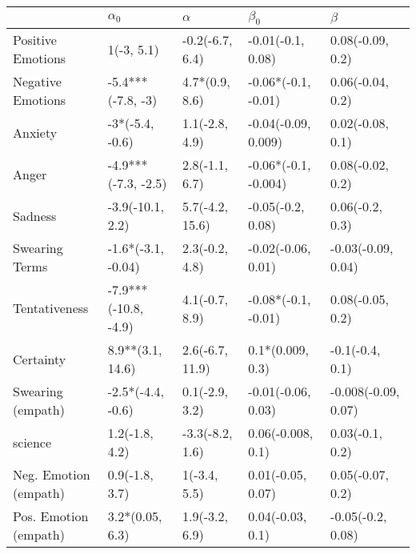 \begin{tabular}{lllll}
\toprule
{} &            $\alpha_0$ &         $\alpha$ &             $\beta_0$ &              $\beta$ \\
\midrule
Positive Emotions     &            1(-3, 5.1) &  -0.2(-6.7, 6.4) &     -0.01(-0.1, 0.08) &     0.08(-0.09, 0.2) \\
Negative Emotions     &     -5.4***(-7.8, -3) &   4.7*(0.9, 8.6) &   -0.06*(-0.1, -0.01) &     0.06(-0.04, 0.2) \\
Anxiety               &       -3*(-5.4, -0.6) &   1.1(-2.8, 4.9) &   -0.04(-0.09, 0.009) &     0.02(-0.08, 0.1) \\
Anger                 &   -4.9***(-7.3, -2.5) &   2.8(-1.1, 6.7) &  -0.06*(-0.1, -0.004) &     0.08(-0.02, 0.2) \\
Sadness               &      -3.9(-10.1, 2.2) &  5.7(-4.2, 15.6) &     -0.05(-0.2, 0.08) &      0.06(-0.2, 0.3) \\
Swearing Terms        &    -1.6*(-3.1, -0.04) &   2.3(-0.2, 4.8) &    -0.02(-0.06, 0.01) &   -0.03(-0.09, 0.04) \\
Tentativeness         &  -7.9***(-10.8, -4.9) &   4.1(-0.7, 8.9) &   -0.08*(-0.1, -0.01) &     0.08(-0.05, 0.2) \\
Certainty             &      8.9**(3.1, 14.6) &  2.6(-6.7, 11.9) &      0.1*(0.009, 0.3) &      -0.1(-0.4, 0.1) \\
Swearing (empath)     &     -2.5*(-4.4, -0.6) &   0.1(-2.9, 3.2) &    -0.01(-0.06, 0.03) &  -0.008(-0.09, 0.07) \\
science               &        1.2(-1.8, 4.2) &  -3.3(-8.2, 1.6) &     0.06(-0.008, 0.1) &      0.03(-0.1, 0.2) \\
Neg. Emotion (empath) &        0.9(-1.8, 3.7) &     1(-3.4, 5.5) &     0.01(-0.05, 0.07) &     0.05(-0.07, 0.2) \\
Pos. Emotion (empath) &       3.2*(0.05, 6.3) &   1.9(-3.2, 6.9) &      0.04(-0.03, 0.1) &    -0.05(-0.2, 0.08) \\
\bottomrule
\end{tabular}
